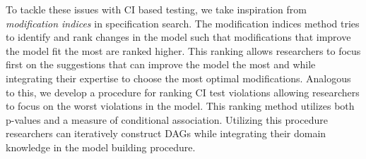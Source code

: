 \documentclass{uai2025} %
\begin{document}


To tackle these issues with CI based testing, we take inspiration from
\emph{modification indices} in specification search. The modification indices
method tries to identify and rank changes in the model such that modifications
that improve the model fit the most are ranked higher. This ranking allows
researchers to focus first on the suggestions that can improve the model the
most and while integrating their expertise to choose the most optimal
modifications. Analogous to this, we develop a procedure for ranking CI test
violations allowing researchers to focus on the worst violations in the model.
This ranking method utilizes both p-values and a measure of conditional
association. Utilizing this procedure researchers can iteratively construct
DAGs while integrating their domain knowledge in the model building procedure.
\end{document}
